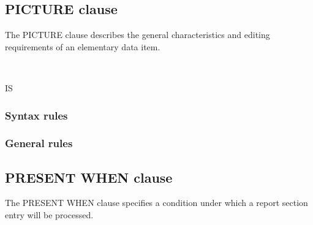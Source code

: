 \subsection{PICTURE clause}

The PICTURE clause describes the general characteristics and editing requirements of an elementary data item.

\begin{syntax}
  \begin{1=}
     \\
  \end{1=}
  IS 
\end{syntax}

\subsubsection{Syntax rules}

\subsubsection{General rules}

\subsection{PRESENT WHEN clause}

The PRESENT WHEN clause specifies a condition under which a report section entry will be processed.

\begin{syntax}
  \begin{1=}
     \\
  \end{1=}
  \begin{1=}
     \condition \\
    
     \\

  \end{1=}
\end{syntax}

